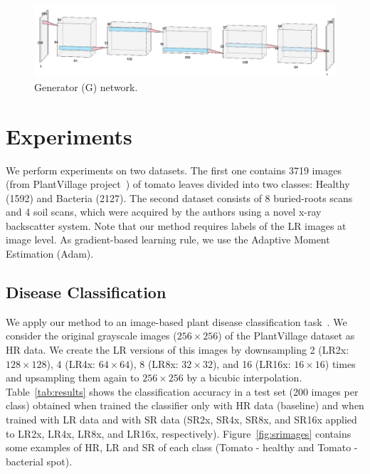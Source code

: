 \documentclass[10pt,twocolumn,letterpaper]{article}
\begin{document}
\begin{figure}[h]
\begin{center}
\includegraphics[scale=0.30]{G_net.png}
\end{center}
\label{fig:G_net}
\caption{Generator (G) network.}
\end{figure}


\section{Experiments}
\label{sec:experiments}


We perform experiments on two datasets. The first one contains 3719 images (from PlantVillage project~\cite{Hughes2015}) of tomato leaves divided into two classes: Healthy (1592) and Bacteria (2127). The second dataset consists of 8 buried-roots scans and 4 soil scans, which were acquired by the authors using a novel x-ray backscatter system. Note that our method requires labels of the LR images at image level. As gradient-based learning rule, we use the Adaptive Moment Estimation (Adam). 

\subsection{Disease Classification}
We apply our method to an image-based plant disease classification task~\cite{Mohanty2016}. We consider the original grayscale images ($256\times 256$) of the PlantVillage dataset as HR data. We create the LR versions of this images by downsampling 2 (LR2x: $128\times 128$), 4 (LR4x: $64\times 64$), 8 (LR8x: $32\times 32$), and 16 (LR16x: $16\times 16$) times and upsampling them again to $256\times 256$ by a bicubic interpolation. Table~\ref{tab:results} shows the classification accuracy in a test set (200 images per class) obtained when trained the classifier only with HR data (baseline) and when trained with LR data and with SR data (SR2x, SR4x, SR8x, and SR16x applied to LR2x, LR4x, LR8x, and LR16x, respectively). Figure~\ref{fig:srimages} contains some examples of HR, LR and SR of each class (Tomato - healthy and Tomato - bacterial spot).
\end{document}
